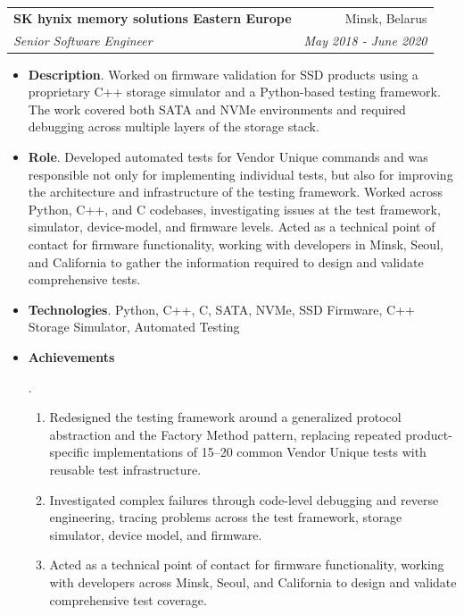 \documentclass[letterpaper,11pt]{article}
\makeatletter
\newcommand{\resumeItem}[2]{
  \item\small{
    \textbf{#1}{. #2 \vspace{-2pt}}
  }
}
\newcommand{\resumeSubheading}[4]{
  \vspace{-1pt}\item
    \begin{tabular*}{0.97\textwidth}{l@{\extracolsep{\fill}}r}
      \textbf{#1} & #2 \\
      \textit{\small#3} & \textit{\small #4} \\
    \end{tabular*}\vspace{-5pt}
}
\newcommand{\resumeItemListStart}{\begin{itemize}}
\newcommand{\resumeItemListEnd}{\end{itemize}\vspace{-5pt}}
\makeatother
\begin{document}
    \resumeSubheading
      {SK hynix memory solutions Eastern Europe}{Minsk, Belarus}
      {Senior Software Engineer}{May 2018 - June 2020}
      \resumeItemListStart
        \resumeItem{Description}
          {Worked on firmware validation for SSD products using a proprietary C++ storage simulator and a Python-based testing framework. The work covered both SATA and NVMe environments and required debugging across multiple layers of the storage stack.}
        \resumeItem{Role}
          {Developed automated tests for Vendor Unique commands and was responsible not only for implementing individual tests, but also for improving the architecture and infrastructure of the testing framework. Worked across Python, C++, and C codebases, investigating issues at the test framework, simulator, device-model, and firmware levels. Acted as a technical point of contact for firmware functionality, working with developers in Minsk, Seoul, and California to gather the information required to design and validate comprehensive tests.}
        \resumeItem{Technologies}
          {Python, C++, C, SATA, NVMe, SSD Firmware, C++ Storage Simulator, Automated Testing}
        \resumeItem{Achievements}
          {
            \begin{enumerate}
              \item Redesigned the testing framework around a generalized protocol abstraction and the Factory Method pattern, replacing repeated product-specific implementations of 15--20 common Vendor Unique tests with reusable test infrastructure.
              \item Investigated complex failures through code-level debugging and reverse engineering, tracing problems across the test framework, storage simulator, device model, and firmware.
              \item Acted as a technical point of contact for firmware functionality, working with developers across Minsk, Seoul, and California to design and validate comprehensive test coverage.
            \end{enumerate}
          }
      \resumeItemListEnd
\end{document}
